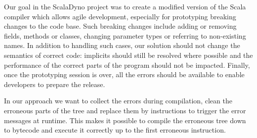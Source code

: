 
Our goal in the ScalaDyno project was to create a modified version of the Scala compiler which allows agile development, especially for prototyping breaking changes to the code base. Such breaking changes include adding or removing fields, methods or classes, changing parameter types or referring to non-existing names. In addition to handling such cases, our solution should not change the semantics of correct code: implicits should still be resolved where possible and the performance of the correct parts of the program should not be impacted. Finally, once the prototyping session is over, all the errors should be available to enable developers to prepare the release.


In our approach we want to collect the errors during compilation, clean the erroneous parts of the tree and replace them by instructions to trigger the error messages at runtime. This makes it possible to compile the erroneous tree down to bytecode and execute it correctly up to the first erroneous instruction.
